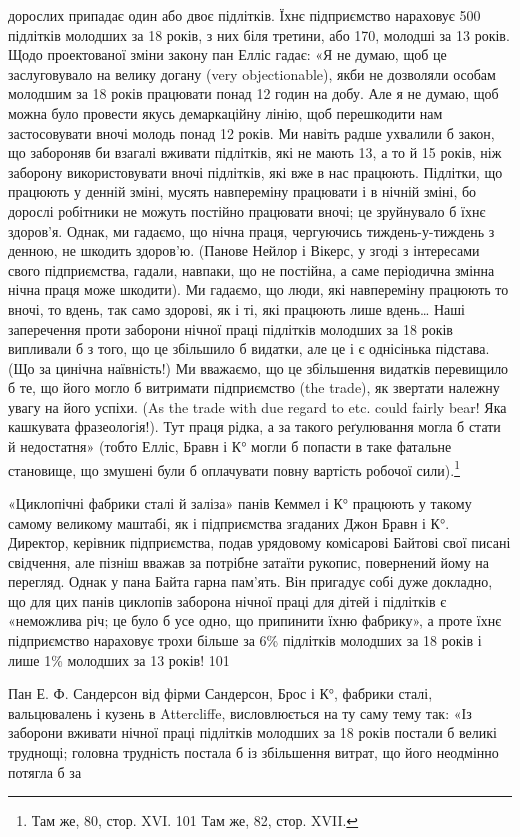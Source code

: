 \parcont{}  %
дорослих припадає один або двоє підлітків. Їхнє підприємство нараховує
500 підлітків молодших за 18 років, з них біля третини,
або 170, молодші за 13 років. Щодо проектованої зміни закону
пан Елліс гадає: «Я не думаю, щоб це заслуговувало на велику
догану (very objectionable), якби не дозволяли особам молодшим
за 18 років працювати понад 12 годин на добу. Але я не думаю,
щоб можна було провести якусь демаркаційну лінію, щоб перешкодити
нам застосовувати вночі молодь понад 12 років. Ми навіть
радше ухвалили б закон, що забороняв би взагалі вживати
підлітків, які не мають 13, а то й 15 років, ніж заборону використовувати
вночі підлітків, які вже в нас працюють. Підлітки,
що працюють у денній зміні, мусять навпереміну працювати і
в нічній зміні, бо дорослі робітники не можуть постійно працювати
вночі; це зруйнувало б їхнє здоров’я. Однак, ми гадаємо,
що нічна праця, чергуючись тиждень-у-тиждень з денною,
не шкодить здоров’ю. (Панове Нейлор і Вікерс, у згоді з інтересами
свого підприємства, гадали, навпаки, що не постійна, а
саме періодична змінна нічна праця може шкодити). Ми гадаємо,
що люди, які навпереміну працюють то вночі, то вдень, так само
здорові, як і ті, які працюють лише вдень\dots{} Наші заперечення
проти заборони нічної праці підлітків молодших за 18 років
випливали б з того, що це збільшило б видатки, але це і є однісінька
підстава. (Що за цинічна наївність!) Ми вважаємо, що це
збільшення видатків перевищило б те, що його могло б витримати
підприємство (the trade), як звертати належну увагу на його
успіхи. (As the trade with due regard to etc. could fairly bear!
Яка кашкувата фразеологія!). Тут праця рідка, а за такого реґулювання
могла б стати й недостатня» (тобто Елліс, Бравн і К°
могли б попасти в таке фатальне становище, що змушені були б
оплачувати повну вартість робочої сили).\footnote{
Там же, 80, стор. XVI.
101 Там же, 82, стор. XVII.
}

«Циклопічні фабрики сталі й заліза» панів Кеммел і К°
працюють у такому самому великому маштабі, як і підприємства
згаданих Джон Бравн і К°. Директор, керівник підприємства,
подав урядовому комісарові Байтові свої писані свідчення, але
пізніш вважав за потрібне затаїти рукопис, повернений йому на
перегляд. Однак у пана Байта гарна пам’ять. Він пригадує собі
дуже докладно, що для цих панів циклопів заборона нічної
праці для дітей і підлітків є «неможлива річ; це було б усе одно,
що припинити їхню фабрику», а проте їхнє підприємство нараховує
трохи більше за 6\% підлітків молодших за 18 років і лише
1\% молодших за 13 років! 101

Пан Е. Ф. Сандерсон від фірми Сандерсон, Брос і К°, фабрики
сталі, вальцювалень і кузень в Attercliffe, висловлюється на ту
саму тему так: «Із заборони вживати нічної праці підлітків молодших
за 18 років постали б великі труднощі; головна трудність
постала б із збільшення витрат, що його неодмінно потягла б за
\parbreak{}  %
